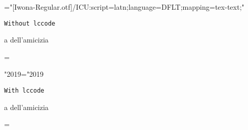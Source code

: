 \font\1="[Iwona-Regular.otf]/ICU:script=latn;language=DFLT;mapping=tex-text;"

\newdimen\savehsize
\savehsize\hsize

\1

{\tt Without lccode}

\hsize=3pt

\noindent a dell'amicizia

\hsize=\savehsize

\lccode"2019="2019

{\tt With lccode}

\hsize=3pt

\noindent a dell'amicizia

\hsize=\savehsize

\bye

